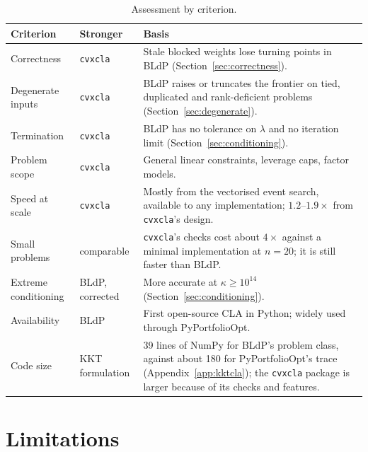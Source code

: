 \documentclass[11pt,a4paper]{article}
\newcommand{\code}[1]{\texttt{#1}}
\newcommand{\cvxcla}{\code{cvxcla}}
\begin{document}
\begin{table}[ht]
  \centering
  \small
  \caption{Assessment by criterion.}\label{tab:assessment}
  \begin{tabularx}{\textwidth}{>{\raggedright\arraybackslash}p{2.8cm}
      >{\raggedright\arraybackslash}p{2.2cm}L}
    \toprule
    Criterion & Stronger & Basis \\
    \midrule
    Correctness & \cvxcla{}
      & Stale blocked weights lose turning points in BLdP
        (Section~\ref{sec:correctness}). \\
    Degenerate inputs & \cvxcla{}
      & BLdP raises or truncates the frontier on tied, duplicated and
        rank-deficient problems (Section~\ref{sec:degenerate}). \\
    Termination & \cvxcla{}
      & BLdP has no tolerance on $\lambda$ and no iteration limit
        (Section~\ref{sec:conditioning}). \\
    Problem scope & \cvxcla{}
      & General linear constraints, leverage caps, factor models. \\
    Speed at scale & \cvxcla{}
      & Mostly from the vectorised event search, available to any
        implementation; $1.2$--$1.9\times$ from \cvxcla{}'s design. \\
    Small problems & comparable
      & \cvxcla{}'s checks cost about $4\times$ against a minimal
        implementation at $n = 20$; it is still faster than BLdP. \\
    Extreme conditioning & BLdP, corrected
      & More accurate at $\kappa \ge 10^{14}$
        (Section~\ref{sec:conditioning}). \\
    Availability & BLdP
      & First open-source CLA in Python; widely used through PyPortfolioOpt. \\
    Code size & KKT formulation
      & 39 lines of NumPy for BLdP's problem class, against about 180 for
        PyPortfolioOpt's trace (Appendix~\ref{app:kktcla}); the \cvxcla{}
        package is larger because of its checks and features. \\
    \bottomrule
  \end{tabularx}
\end{table}

\section{Limitations}\label{sec:limitations}
\end{document}
